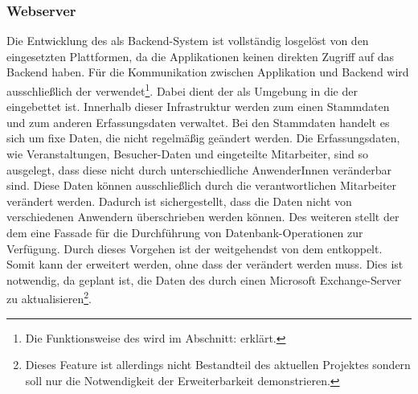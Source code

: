 \documentclass[Bachelorarbeit.tex]{subfiles}
\begin{document}
\subsubsection*{Webserver}
\label{subsub:webserver}
Die Entwicklung des  als Backend-System ist vollständig losgelöst von den eingesetzten Plattformen,
da die Applikationen keinen direkten Zugriff auf das Backend haben.
Für die Kommunikation zwischen Applikation und Backend wird ausschließlich der  verwendet\footnote{Die Funktionsweise des  wird im Abschnitt:  erklärt.}. 
Dabei dient der  als Umgebung in die der    eingebettet ist. Innerhalb dieser Infrastruktur werden zum einen Stammdaten und zum anderen Erfassungsdaten verwaltet.
Bei den Stammdaten handelt es sich um fixe Daten, die nicht regelmäßig geändert werden.
Die Erfassungsdaten, wie Veranstaltungen, Besucher-Daten und eingeteilte Mitarbeiter, sind so ausgelegt, dass diese nicht durch unterschiedliche AnwenderInnen veränderbar sind. 
Diese Daten können ausschließlich durch die verantwortlichen Mitarbeiter verändert werden. Dadurch ist sichergestellt, dass die Daten nicht von verschiedenen Anwendern überschrieben werden können.
Des weiteren stellt der  dem  eine Fassade für die Durchführung von Datenbank-Operationen zur Verfügung.
Durch dieses Vorgehen ist der  weitgehendst von dem   entkoppelt.
Somit kann der  erweitert werden, ohne dass der  verändert werden muss. 
Dies ist notwendig, da geplant ist, die Daten des  durch einen Microsoft Exchange-Server zu aktualisieren\footnote{Dieses Feature ist allerdings nicht Bestandteil des aktuellen Projektes sondern soll nur die Notwendigkeit der Erweiterbarkeit demonstrieren.}.
\end{document}
